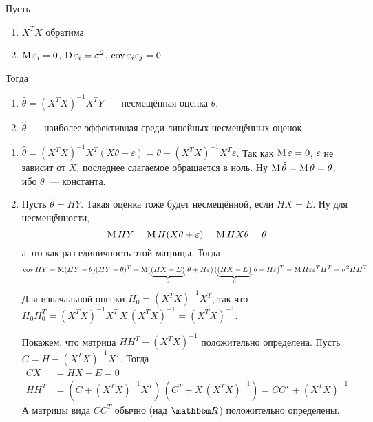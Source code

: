 \documentclass[12pt,timbord]{../../../notes}
\begin{document}
\begin{thrm}\label{thrm:stat::guasmark}
  Пусть 
  \begin{enumerate}
    \item $X^TX$ обратима
    \item $\operatorname{M} \varepsilon_i  = 0$, $\operatorname{D} \varepsilon_i = \sigma^2$, $\operatorname{cov} \varepsilon_i \varepsilon_j = 0$
  \end{enumerate}
  Тогда 
  \begin{enumerate}
    \item $\hat \theta = (X^T X)^{-1} X^T Y$~--- несмещённая оценка $\theta$,
    \item $\hat\theta$~--- наиболее эффективная среди линейных несмещённых оценок
  \end{enumerate}
\end{thrm}
\begin{ittproof}
  \begin{enumerate}
    \item $\hat \theta = (X^TX)^{-1} X^T (X\theta + \varepsilon) = \theta + (X^TX)^{-1} X^T
      \varepsilon $. Так как $\operatorname{M} \varepsilon = 0$, $\varepsilon$ не зависит от $X$, последнее
      слагаемое обращается в ноль. Ну $\operatorname{M} \hat\theta = \operatorname{M}\theta = \theta $, ибо $\theta$~--- константа.
    \item Пусть $\widetilde{\theta} = HY$. Такая оценка тоже будет несмещённой, если $HX = E$. Ну 
      для несмещённости, 
    \[
        \operatorname{M} HY = \operatorname{M} H(X\theta + \varepsilon) = \operatorname{M} H X \theta  = \theta
    \]а это как раз единичность этой матрицы.
      Тогда\[
        \operatorname{cov} HY = \operatorname{M} (HY - \theta ) (HY - \theta )^T 
        = \operatorname{M} ( \underbrace{(HX-E)}_0\, \theta + H\varepsilon)\,( \underbrace{(HX-E)}_0\, \theta + H\varepsilon)^T
        = \operatorname{M} H \varepsilon \varepsilon^T H^T = \sigma^2 HH^T
      \]
      Для изначальной оценки $H_0 = (X^T X)^{-1}X^T$, так что 
      $H_0H_0^T =(X^T X)^{-1}X^T \, X \, (X^T X)^{-1} = (X^TX)^{-1}$.

      Покажем, что матрица $HH^T - (X^T X)^{-1} $ положительно определена. Пусть 
      $C = H - (X^T X)^{-1}X^T$. Тогда 
      \begin{align*}
        CX &= HX - E = 0\\
        HH^T &= (C + (X^T X)^{-1} X^T)\, (C^T + X\,(X^T X)^{-1}) = CC^T + (X^TX)^{-1}
      \end{align*}
      А матрицы вида $CC^T$ обычно (над $\R$) положительно определены.
  \end{enumerate}
\end{ittproof}
\end{document}
